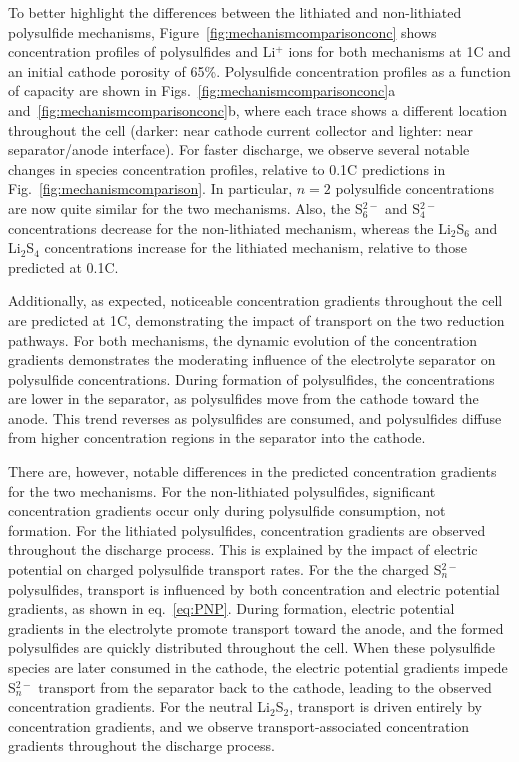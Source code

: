 \documentclass{elsarticle}
\begin{document}
To better highlight the differences between the lithiated and non-lithiated polysulfide mechanisms, Figure~\ref{fig:mechanismcomparisonconc} shows concentration profiles of polysulfides and Li$^+$ ions for both mechanisms at 1C and an initial cathode porosity of 65\%. Polysulfide concentration profiles as a function of capacity are shown in Figs.~\ref{fig:mechanismcomparisonconc}a and~\ref{fig:mechanismcomparisonconc}b, where each trace shows a different location throughout the cell (darker: near cathode current collector and lighter: near separator/anode interface). For faster discharge, we observe several notable changes in species concentration profiles, relative to 0.1C predictions in Fig.~\ref{fig:mechanismcomparison}. In particular, $n=2$ polysulfide concentrations are now quite similar for the two mechanisms. Also, the S$_6^{2-}$ and  S$_4^{2-}$ concentrations decrease for the non-lithiated mechanism, whereas the  Li$_2$S$_6$ and Li$_2$S$_4$ concentrations increase for the lithiated mechanism, relative to those predicted at 0.1C.

Additionally, as expected, noticeable concentration gradients throughout the cell are predicted at 1C, demonstrating the impact of transport on the two reduction pathways. For both mechanisms, the dynamic evolution of the concentration gradients demonstrates the moderating influence of the electrolyte separator on polysulfide concentrations.  During formation of polysulfides, the concentrations are lower in the separator, as polysulfides move from the cathode toward the anode.  This trend reverses as polysulfides are consumed, and polysulfides diffuse from higher concentration regions in the separator into the cathode. 

There are, however, notable differences in the predicted concentration gradients for the two mechanisms. For the non-lithiated polysulfides, significant concentration gradients occur only during polysulfide consumption, not formation. For the lithiated polysulfides, concentration gradients are observed throughout the discharge process. This is explained by the impact of electric potential on charged polysulfide transport rates. For the the charged S$_n^{2-}$ polysulfides, transport is influenced by both concentration and electric potential gradients, as shown in eq.~\ref{eq:PNP}. During formation, electric potential gradients in the electrolyte promote transport toward the anode, and the formed polysulfides are quickly distributed throughout the cell. When these polysulfide species are later consumed in the cathode, the electric potential gradients impede S$_n^{2-}$ transport from the separator back to the cathode, leading to the observed concentration gradients. For the neutral Li$_2$S$_2$, transport is driven entirely by concentration gradients, and we observe transport-associated concentration gradients throughout the discharge process.
\end{document}
